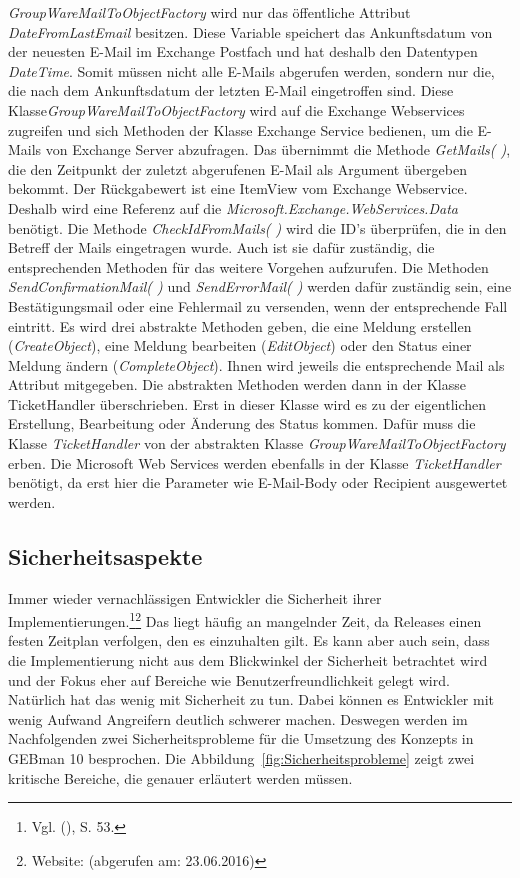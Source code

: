 \noindent
\textit{GroupWareMailToObjectFactory} wird nur das öffentliche Attribut \textit{DateFromLastEmail} besitzen. Diese Variable speichert das Ankunftsdatum von der neuesten E-Mail im Exchange Postfach und hat deshalb den Datentypen \textit{DateTime}. Somit müssen nicht alle E-Mails abgerufen werden, sondern nur die, die nach dem Ankunftsdatum der letzten E-Mail eingetroffen sind.\newline
Diese Klasse\textit{GroupWareMailToObjectFactory} wird auf die Exchange Webservices zugreifen und sich Methoden der Klasse Exchange Service bedienen, um die E-Mails von Exchange Server abzufragen. Das übernimmt die Methode \textit{GetMails( )}, die den Zeitpunkt der zuletzt abgerufenen E-Mail als Argument übergeben bekommt. Der Rückgabewert ist eine ItemView vom Exchange Webservice. Deshalb wird eine Referenz auf die \textit{Microsoft.Exchange.WebServices.Data} benötigt.
\newline 
Die Methode \textit{CheckIdFromMails( )} wird die ID's überprüfen, die in den Betreff der Mails eingetragen wurde. Auch ist sie dafür zuständig, die entsprechenden Methoden für das weitere Vorgehen aufzurufen. Die Methoden \textit{SendConfirmationMail( )} und \textit{SendErrorMail( )} werden dafür zuständig sein, eine Bestätigungsmail oder eine Fehlermail zu versenden, wenn der entsprechende Fall eintritt. Es wird drei abstrakte Methoden geben, die eine Meldung erstellen (\textit{CreateObject}), eine Meldung bearbeiten (\textit{EditObject}) oder den Status einer Meldung ändern (\textit{CompleteObject}). Ihnen wird jeweils die entsprechende Mail als Attribut mitgegeben.\newline
Die abstrakten Methoden werden dann in der Klasse TicketHandler überschrieben. Erst in dieser Klasse wird es zu der eigentlichen Erstellung, Bearbeitung oder Änderung des Status kommen. Dafür muss die Klasse \textit{TicketHandler} von der abstrakten Klasse \textit{GroupWareMailToObjectFactory} erben. Die Microsoft Web Services werden ebenfalls in der Klasse \textit{TicketHandler} benötigt, da erst hier die Parameter wie E-Mail-Body oder Recipient ausgewertet werden.\\


\subsection{Sicherheitsaspekte}
\noindent
Immer wieder vernachlässigen Entwickler die Sicherheit ihrer Implementierungen.\footnote{Vgl. \citeauthor{Ziegler} (\citeyear{Ziegler}), S. 53.}\footnote{Website: \citeauthor{Sicherheit} (abgerufen am: 23.06.2016)} Das liegt häufig an mangelnder Zeit, da Releases einen festen Zeitplan verfolgen, den es einzuhalten gilt. Es kann aber auch sein, dass die Implementierung nicht aus dem Blickwinkel der Sicherheit betrachtet wird und der Fokus eher auf Bereiche wie Benutzerfreundlichkeit gelegt wird. Natürlich hat das wenig mit Sicherheit zu tun. Dabei können es Entwickler mit wenig Aufwand Angreifern deutlich schwerer machen. Deswegen werden im Nachfolgenden zwei Sicherheitsprobleme für die Umsetzung des Konzepts in GEBman 10 besprochen. Die Abbildung~\ref{fig:Sicherheitsprobleme} zeigt zwei kritische Bereiche, die genauer erläutert werden müssen.

